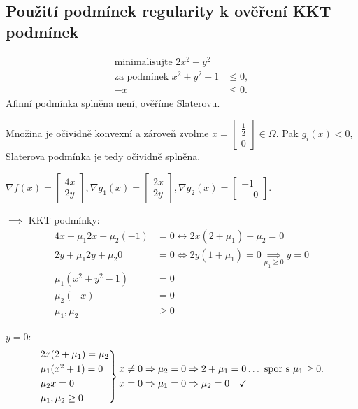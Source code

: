 \subsection{Použití podmínek regularity k ověření KKT podmínek}
\begin{align*}
    \text{minimalisujte } 2x^2 + y^2 \\
    \text{za podmínek } x^2 + y^2 - 1 &\leq 0, \\
    -x &\leq 0.
\end{align*}
\hyperref[afinniPodm]{Afinní podmínka} splněna není, ověříme \hyperref[slaterPodm]{Slaterovu}. 


Množina je očividně konvexní a zároveň zvolme $x = 
\begin{bmatrix}
    \frac{1}{2} \\
    0    
\end{bmatrix} \in \Omega$. Pak $g_i (x) < 0$, Slaterova podmínka je tedy očividně splněna.

$\nabla f (x) = 
\begin{bmatrix}
    4x \\
    2y    
\end{bmatrix}, \nabla g_1(x) =
\begin{bmatrix}
    2x \\
    2y
\end{bmatrix}, \nabla g_2(x) = 
\begin{bmatrix}
    -1\\
    \phantom{-}0
\end{bmatrix}$.

$\implies$ KKT podmínky:
\begin{align*}
    4x + \mu_1 2 x + \mu_2 (-1) &= 0 \leftrightarrow 2x (2+\mu_1) - \mu_2 = 0 \\
    2y + \mu_1 2 y + \mu_2 0    &= 0 \Leftrightarrow 2y (1+\mu_1) = 0 \underset{\mu_1 \geq 0}{\implies} y = 0 \\
    \mu_1(x^2 + y^2 - 1) &= 0 \\
    \mu_2(-x) &= 0 \\
    \mu_1, \mu_2 &\geq 0  
\end{align*}

$y=0$:
\[
    \begin{rcases*}
        2x(2+ \mu_1) = \mu_2 \\
        \mu_1(x^2 + 1) = 0 \\
        \mu_2 x = 0 \\
        \mu_1, \mu_2 \geq 0
    \end{rcases*}
    \begin{aligned}
        &x \not= 0 \Rightarrow \mu_2 = 0 \Rightarrow 2 + \mu_1 = 0 \dots \text{ spor s } \mu_1 \geq 0.\\
        &x = 0 \Rightarrow \mu_1 = 0 \Rightarrow \mu_2 = 0 \quad \checkmark
    \end{aligned}
\]

